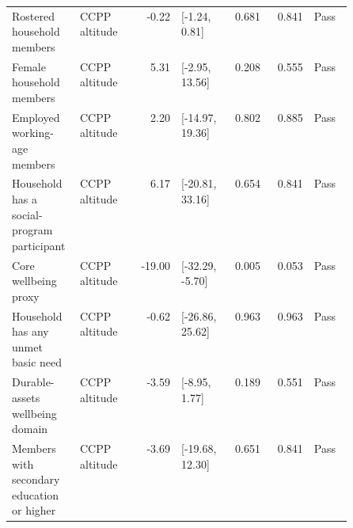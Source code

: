 \begin{longtable}{@{}p{0.20\linewidth}p{0.16\linewidth}rp{0.14\linewidth}rrl@{}}
Rostered household members & CCPP altitude & -0.22 & [-1.24, 0.81] & 0.681 & 0.841 & Pass \\
Female household members & CCPP altitude & 5.31 & [-2.95, 13.56] & 0.208 & 0.555 & Pass \\
Employed working-age members & CCPP altitude & 2.20 & [-14.97, 19.36] & 0.802 & 0.885 & Pass \\
Household has a social-program participant & CCPP altitude & 6.17 & [-20.81, 33.16] & 0.654 & 0.841 & Pass \\
Core wellbeing proxy & CCPP altitude & -19.00 & [-32.29, -5.70] & 0.005 & 0.053 & Pass \\
Household has any unmet basic need & CCPP altitude & -0.62 & [-26.86, 25.62] & 0.963 & 0.963 & Pass \\
Durable-assets wellbeing domain & CCPP altitude & -3.59 & [-8.95, 1.77] & 0.189 & 0.551 & Pass \\
Members with secondary education or higher & CCPP altitude & -3.69 & [-19.68, 12.30] & 0.651 & 0.841 & Pass \\
\end{longtable}
\endgroup
